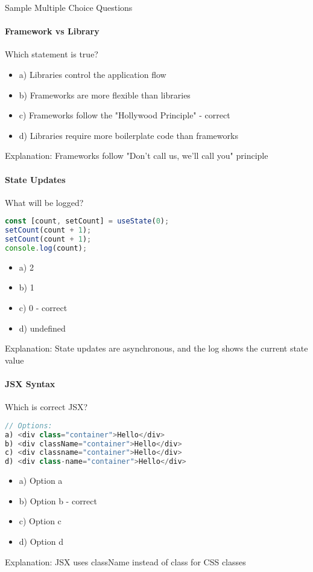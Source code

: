 \begin{KR}{Sample Multiple Choice Questions}

\paragraph{Framework vs Library}
Which statement is true?
\begin{itemize}
    \item a) Libraries control the application flow
    \item b) Frameworks are more flexible than libraries
    \item c) Frameworks follow the "Hollywood Principle" - correct
    \item d) Libraries require more boilerplate code than frameworks
\end{itemize}
Explanation: Frameworks follow "Don't call us, we'll call you" principle

\paragraph{State Updates}
What will be logged?
\begin{lstlisting}[language=JavaScript, style=basesmol]
const [count, setCount] = useState(0);
setCount(count + 1);
setCount(count + 1);
console.log(count);
\end{lstlisting}
\begin{itemize}
    \item a) 2
    \item b) 1
    \item c) 0 - correct
    \item d) undefined
\end{itemize}
Explanation: State updates are asynchronous, and the log shows the current state value

\paragraph{JSX Syntax}
Which is correct JSX?
\begin{lstlisting}[language=JavaScript, style=basesmol]
// Options:
a) <div class="container">Hello</div>
b) <div className="container">Hello</div>
c) <div classname="container">Hello</div>
d) <div class-name="container">Hello</div>
\end{lstlisting}
\begin{itemize}
    \item a) Option a
    \item b) Option b - correct
    \item c) Option c
    \item d) Option d
\end{itemize}
Explanation: JSX uses className instead of class for CSS classes
\end{KR}

